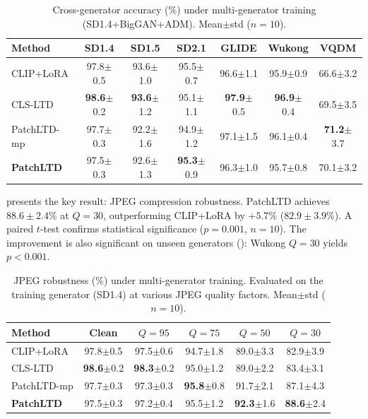\documentclass[runningheads]{llncs}
\newcommand{\ours}{PatchLTD}
\begin{document}
\begin{table}[t]
\centering
\caption{Cross-generator accuracy (\%) under multi-generator training (SD1.4+BigGAN+ADM). Mean$\pm$std ($n{=}10$).}
\label{tab:cross_gen}
\setlength{\tabcolsep}{3.5pt}
\begin{tabular}{lcccccc}
\toprule
Method & SD1.4 & SD1.5 & SD2.1 & GLIDE & Wukong & VQDM \\
\midrule
CLIP+LoRA      & 97.8\scriptsize$\pm$0.5 & 93.6\scriptsize$\pm$1.0 & 95.5\scriptsize$\pm$0.7 & 96.6\scriptsize$\pm$1.1 & 95.9\scriptsize$\pm$0.9 & 66.6\scriptsize$\pm$3.2 \\
CLS-LTD        & \textbf{98.6}\scriptsize$\pm$0.2 & \textbf{93.6}\scriptsize$\pm$1.2 & 95.1\scriptsize$\pm$1.1 & \textbf{97.9}\scriptsize$\pm$0.5 & \textbf{96.9}\scriptsize$\pm$0.4 & 69.5\scriptsize$\pm$3.5 \\
\ours{}-mp     & 97.7\scriptsize$\pm$0.3 & 92.2\scriptsize$\pm$1.6 & 94.9\scriptsize$\pm$1.2 & 97.1\scriptsize$\pm$1.5 & 96.1\scriptsize$\pm$0.4 & \textbf{71.2}\scriptsize$\pm$3.7 \\
\textbf{\ours{}} & 97.5\scriptsize$\pm$0.3 & 92.6\scriptsize$\pm$1.3 & \textbf{95.3}\scriptsize$\pm$0.9 & 96.3\scriptsize$\pm$1.0 & 95.7\scriptsize$\pm$0.8 & 70.1\scriptsize$\pm$3.2 \\
\bottomrule
\end{tabular}
\end{table}

 presents the key result: JPEG compression robustness.
\ours{} achieves $88.6{\pm}2.4\%$ at $Q{=}30$, outperforming CLIP+LoRA by $+5.7\%$ ($82.9{\pm}3.9\%$).
A paired $t$-test confirms statistical significance ($p{=}0.001$, $n{=}10$).
The improvement is also significant on unseen generators (): Wukong $Q{=}30$ yields $p{<}0.001$.

\begin{table}[t]
\centering
\caption{JPEG robustness (\%) under multi-generator training. Evaluated on the training generator (SD1.4) at various JPEG quality factors. Mean$\pm$std ($n{=}10$).}
\label{tab:jpeg}
\setlength{\tabcolsep}{4pt}
\begin{tabular}{lccccc}
\toprule
Method & Clean & $Q{=}95$ & $Q{=}75$ & $Q{=}50$ & $Q{=}30$ \\
\midrule
CLIP+LoRA      & 97.8\scriptsize$\pm$0.5 & 97.5\scriptsize$\pm$0.6 & 94.7\scriptsize$\pm$1.8 & 89.0\scriptsize$\pm$3.3 & 82.9\scriptsize$\pm$3.9 \\
CLS-LTD        & \textbf{98.6}\scriptsize$\pm$0.2 & \textbf{98.3}\scriptsize$\pm$0.2 & 95.0\scriptsize$\pm$1.2 & 89.0\scriptsize$\pm$2.2 & 83.4\scriptsize$\pm$3.1 \\
\ours{}-mp     & 97.7\scriptsize$\pm$0.3 & 97.3\scriptsize$\pm$0.3 & \textbf{95.8}\scriptsize$\pm$0.8 & 91.7\scriptsize$\pm$2.1 & 87.1\scriptsize$\pm$4.3 \\
\textbf{\ours{}} & 97.5\scriptsize$\pm$0.3 & 97.2\scriptsize$\pm$0.4 & 95.5\scriptsize$\pm$1.2 & \textbf{92.3}\scriptsize$\pm$1.6 & \textbf{88.6}\scriptsize$\pm$2.4 \\
\bottomrule
\end{tabular}
\end{table}
\end{document}
